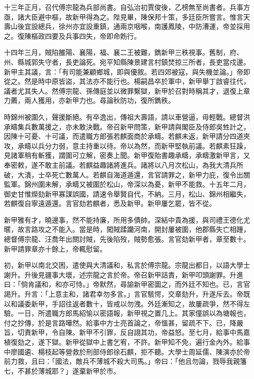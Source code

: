 \begin{pinyinscope}
十三年正月，召代傅宗龍為兵部尚書。自弘治初賈俊後，乙榜無至尚書者。兵事方亟，諸大臣避中樞，故新甲得為之。陛見畢，陳保邦十策，多廷臣所嘗言。惟言天壽山後宜設總兵，徐州亦宜設重鎮，通兩京咽喉，南護鳳陵，中防漕運，帝並採用之。復陳樞政四要及兵事四失，帝即命飭行。

十四年三月，賊陷雒陽、襄陽，福、襄二王被難，鐫新甲三秩視事。舊制，府、州、縣城郭失守者，長吏論死。宛平知縣陳景建言村鎮焚掠三所者，長吏當戍邊。新甲主其議，言：「有司能兼顧鄉城，即與優敘。若四郊被寇，與失機並論。」帝即從之。然是時中原皆盜，其法亦不能行也。楊嗣昌卒於軍中，新甲舉丁啟睿往代，議者尤其失人。然傅宗龍、孫傳庭並以微罪繫獄，新甲於召對時稱其才，退復上章力薦，兩人獲用，亦新甲力也。尋論秋防功，復所鐫秩。

時錦州被圍久，聲援斷絕。有卒逸出，傳祖大壽語，請以車營逼，毋輕戰。總督洪承疇集兵數萬援之，亦未敢決戰。帝召新甲問策，新甲請與閣臣及侍郎吳甡計之，因陳十可憂、十可議，而遣職方郎張若麒面商於承疇。若麒未返，新甲請分四道夾攻，承疇以兵分力弱，意主持重以待。帝以為然，而新甲堅執前議。若麒素狂躁，見諸軍稍有斬獲，謂圍可立解，密奏上聞。新甲復貽書趣承疇，承疇激新甲言，又奉密敕，遂不敢主前議。若麒益趣諸將進兵。諸將以八月次松山，為我大清兵所破，大潰，士卒死亡數萬人。若麒自海道遁還，言官請罪之，新甲力庇，復令出關監軍。錦州圍未解，承疇又被圍於松山，帝深以為憂，新甲不能救。十五年二月，御史甘惟爃劾新甲寡謀誤國，請速令舉賢自代，不納。三月，松山、錦州相繼失，若麒復自寧遠遁還。言官劾若麒者，悉及新甲。新甲屢乞罷，皆不從。

新甲雅有才，曉邊事，然不能持廉，所用多債帥。深結中貴為援，與司禮王德化尤暱，故言路攻之不能入。當是時，闖賊蹂躪河南，開封屢被圍，他郡縣失亡相踵，總督傅宗龍、汪喬年出關討賊，先後陷歿，賊勢愈張。言官劾新甲者，章至數十。新甲請罪章亦十餘上，帝輒慰留。

初，新甲以南北交困，遣使與大清議和，私言於傅宗龍。宗龍出都日，以語大學士謝升。升後見疆事大壞，述宗龍之言於帝。帝召新甲詰責，新甲叩頭謝罪。升進曰：「倘肯議和，和亦可恃。」帝默然，尋諭新甲密圖之，而外廷不知也。已，言官謁升。升言：「上意主和，諸君幸勿多言。」言官駭愕，交章劾升，升遂斥去。帝既以和議委新甲，手詔往返者數十，皆戒以勿洩。外廷漸知之，故屢疏爭，然不得左驗。一日，所遣職方郎馬紹愉以密語報，新甲視之置几上。其家僮誤以為塘報也，付之抄傳，於是言路嘩然。給事中方士亮首論之，帝慍甚，留疏不下。已，降嚴旨，切責新甲，令自陳。新甲不引罪，反自詡其功，帝益怒。至七月，給事中馬嘉植復劾之，遂下獄。新甲從獄中上書乞宥，不許。新甲知不免，遍行金內外。給事中廖國遴、楊枝起等營救於刑部侍郎徐石麒，拒不聽。大學士周延儒、陳演亦於帝前力救，且曰：「國法，敵兵不薄城不殺大司馬。」帝曰：「他且勿論，戮辱我親籓七，不甚於薄城耶？」遂棄新甲於市。


\end{pinyinscope}

